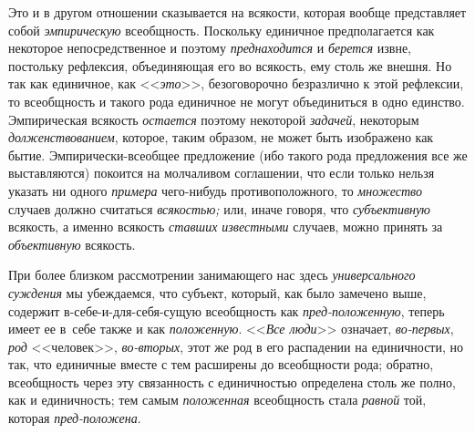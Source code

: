 \label{bkm:bm38a}Это и в другом отношении сказывается на всякости, которая
вообще представляет собой {\em эмпирическую} всеобщность. Поскольку единичное
предполагается как некоторое непосредственное и поэтому {\em преднаходится} и
{\em берется} извне, постольку рефлексия, объединяющая его во всякость, ему
столь же внешня. Но так как единичное, как <<{\em это}>>, безоговорочно
безразлично к этой рефлексии, то всеобщность и такого рода единичное не могут
объединиться в одно единство. Эмпирическая всякость {\em остается} поэтому
некоторой {\em задачей}, некоторым {\em долженствованием}, которое, таким
образом, не может быть изображено как бытие. Эмпирически-всеобщее предложение
(ибо такого рода предложения все же выставляются) покоится на молчаливом
соглашении, что если только нельзя указать ни одного {\em примера} чего-нибудь
противоположного, то {\em множество} случаев должно считаться {\em всякостью;}
или, иначе говоря, что {\em субъективную} всякость, а именно всякость
{\em ставших известными} случаев, можно принять за {\em объективную} всякость.

При более близком рассмотрении занимающего нас здесь {\em универсального
суждения} мы убеждаемся, что субъект, который, как было замечено выше, содержит
в-себе-и-для-себя-сущую всеобщность как {\em пред-положенную}, теперь имеет ее
в~себе также и как {\em положенную}. <<{\em Все люди}>> означает,
{\em во-первых}, {\em род} <<человек>>, {\em во-вторых}, этот же род в его
распадении на единичности, но так, что единичные вместе с тем расширены до
всеобщности рода; обратно, всеобщность через эту связанность с единичностью
определена столь же полно, как и единичность; тем самым {\em положенная}
всеобщность стала {\em равной} той, которая {\em пред-положена}.

